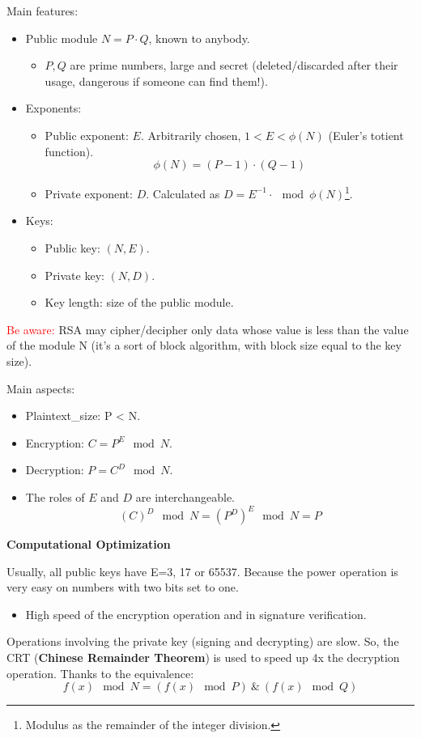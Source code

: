 Main features:
\begin{itemize}
    \item Public module $N = P \cdot Q$, known to anybody.
    \begin{itemize}
        \item $P, Q$ are prime numbers, large and secret (deleted/discarded after their usage, dangerous if someone can find them!).
    \end{itemize} 
    \item Exponents:
    \begin{itemize}
        \item Public exponent: $E$. Arbitrarily chosen, $1 < E < \phi(N)$ (Euler's totient function).
        \[
            \phi(N) = (P-1) \cdot (Q-1)
        \]
        \item Private exponent: $D$. Calculated as $D = E^{-1}\cdot \mod \phi(N)$\footnote{Modulus as the remainder of the integer division.}.
    \end{itemize}
    \item Keys:
    \begin{itemize}
        \item Public key: $(N, E)$.
        \item Private key: $(N, D)$.
        \item Key length: size of the public module.
    \end{itemize}
\end{itemize}

\noindent\textcolor{Red}{Be aware:} RSA may cipher/decipher only data whose value is less than the value of the module N (it's a sort of block algorithm, with block size equal to the key size).

\noindent Main aspects:
\begin{itemize}
    \item Plaintext\_size: P < N.
    \item Encryption: $C = P^E \mod N$.
    \item Decryption: $P = C^D \mod N$.
    \item The roles of $E$ and $D$ are interchangeable.
    \[
        (C)^D \mod N = (P^D)^E \mod N = P
    \]
\end{itemize}

\begin{center}
    \textbf{Computational Optimization}
\end{center}

Usually, all public keys have E=3, 17 or 65537. Because the power operation is very easy on numbers with two bits set to one.
\begin{itemize}
    \item High speed of the encryption operation and in signature verification.
\end{itemize}
Operations involving the private key (signing and decrypting) are slow. So, the CRT (\textbf{Chinese Remainder Theorem}) is used to speed up 4x the decryption operation.
Thanks to the equivalence: 
\[
    f(x) \mod N = (f(x) \mod P)\ \&\ (f(x) \mod Q)
\]


